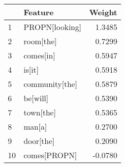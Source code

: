 \begin{tabular}{llr}
\toprule
{} &         Feature &  Weight \\
\midrule
1  &  PROPN[looking] &  1.3485 \\
2  &       room[the] &  0.7299 \\
3  &       comes[in] &  0.5947 \\
4  &          is[it] &  0.5918 \\
5  &  community[the] &  0.5879 \\
6  &        be[will] &  0.5390 \\
7  &       town[the] &  0.5365 \\
8  &          man[a] &  0.2700 \\
9  &       door[the] &  0.2090 \\
10 &    comes[PROPN] & -0.0780 \\
\bottomrule
\end{tabular}
